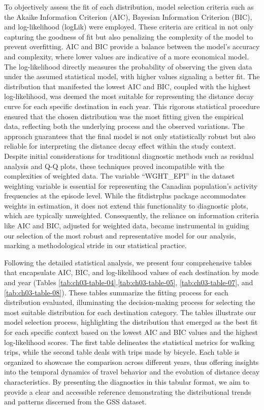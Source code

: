 \documentclass[
11pt, %
oneside, %
english, %
singlespacing, %
]{macthesis} %
\begin{document}
To objectively assess the fit of each distribution, model selection criteria such as the Akaike Information Criterion (AIC), Bayesian Information Criterion (BIC), and log-likelihood (logLik) were employed. These criteria are critical in not only capturing the goodness of fit but also penalizing the complexity of the model to prevent overfitting. AIC and BIC provide a balance between the model's accuracy and complexity, where lower values are indicative of a more economical model. The log-likelihood directly measures the probability of observing the given data under the assumed statistical model, with higher values signaling a better fit. The distribution that manifested the lowest AIC and BIC, coupled with the highest log-likelihood, was deemed the most suitable for representing the distance decay curve for each specific destination in each year. This rigorous statistical procedure ensured that the chosen distribution was the most fitting given the empirical data, reflecting both the underlying process and the observed variations. The approach guarantees that the final model is not only statistically robust but also reliable for interpreting the distance decay effect within the study context. Despite initial considerations for traditional diagnostic methods such as residual analysis and Q-Q plots, these techniques proved incompatible with the complexities of weighted data. The variable ``WGHT\_EPI'' in the dataset weighting variable is essential for representing the Canadian population's activity frequencies at the episode level. While the fitdistrplus package accommodates weights in estimation, it does not extend this functionality to diagnostic plots, which are typically unweighted. Consequently, the reliance on information criteria like AIC and BIC, adjusted for weighted data, became instrumental in guiding our selection of the most robust and representative model for our analysis, marking a methodological stride in our statistical practice.

Following the detailed statistical analysis, we present four comprehensive tables that encapsulate AIC, BIC, and log-likelihood values of each destination by mode and year (Tables \ref{tab:ch03-table-04},\ref{tab:ch03-table-05}, \ref{tab:ch03-table-07}, and \ref{tab:ch03-table-08}). These tables summarize the fitting process for each distribution evaluated, illuminating the decision-making process for selecting the most suitable distribution for each destination category. The tables illustrate our model selection process, highlighting the distribution that emerged as the best fit for each specific context based on the lowest AIC and BIC values and the highest log-likelihood scores. The first table delineates the statistical metrics for walking trips, while the second table deals with trips made by bicycle. Each table is organized to showcase the comparison across different years, thus offering insights into the temporal dynamics of travel behavior and the evolution of distance decay characteristics. By presenting the diagnostics in this tabular format, we aim to provide a clear and accessible reference demonstrating the distributional trends and patterns discerned from the GSS dataset.
\end{document}
